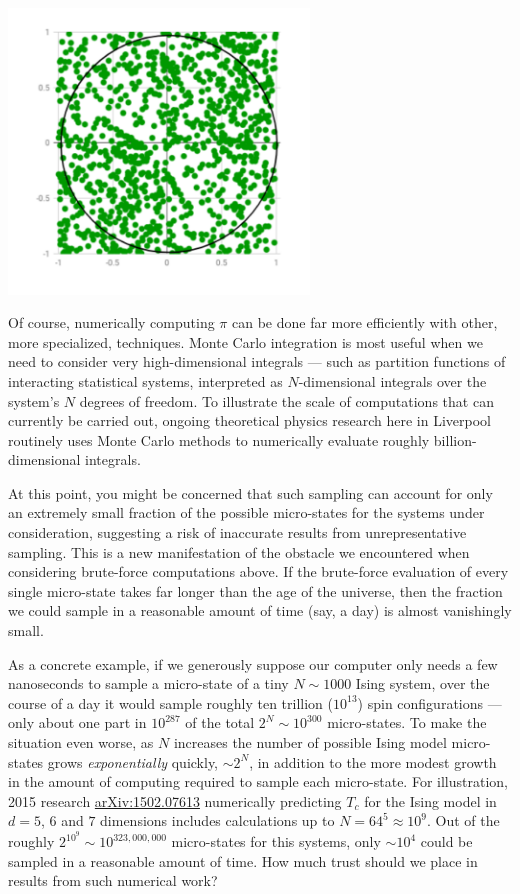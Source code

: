 \begin{center}\includegraphics[width=0.6\textwidth]{figs/unit10_pi.pdf}\end{center}

Of course, numerically computing $\pi$ can be done far more efficiently with other, more specialized, techniques.
Monte Carlo integration is most useful when we need to consider very high-dimensional integrals --- such as partition functions of interacting statistical systems, interpreted as $N$-dimensional integrals over the system's $N$ degrees of freedom.
To illustrate the scale of computations that can currently be carried out, ongoing theoretical physics research here in Liverpool routinely uses Monte Carlo methods to numerically evaluate roughly billion-dimensional integrals.

At this point, you might be concerned that such sampling can account for only an extremely small fraction of the possible micro-states for the systems under consideration, suggesting a risk of inaccurate results from unrepresentative sampling.
This is a new manifestation of the obstacle we encountered when considering brute-force computations above.
If the brute-force evaluation of every single micro-state takes far longer than the age of the universe, then the fraction we could sample in a reasonable amount of time (say, a day) is almost vanishingly small.

As a concrete example, if we generously suppose our computer only needs a few nanoseconds to sample a micro-state of a tiny $N \sim 1000$ Ising system, over the course of a day it would sample roughly ten trillion ($10^{13}$) spin configurations --- only about one part in $10^{287}$ of the total $2^N \sim 10^{300}$ micro-states.
To make the situation even worse, as $N$ increases the number of possible Ising model micro-states grows \textit{exponentially} quickly, $\sim$$2^N$, in addition to the more modest growth in the amount of computing required to sample each micro-state.
For illustration, 2015 research \href{https://arxiv.org/abs/1502.07613}{arXiv:1502.07613} numerically predicting $T_c$ for the Ising model in $d = 5$, $6$ and $7$ dimensions includes calculations up to $N = 64^5 \approx 10^9$.
Out of the roughly $2^{10^9} \sim 10^{323{,}000{,}000}$ micro-states for this systems, only $\sim$$10^4$ could be sampled in a reasonable amount of time.
How much trust should we place in results from such numerical work?

